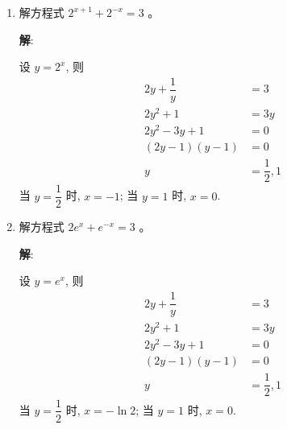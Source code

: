 \documentclass{report}
\newcommand{\sol}{\vspace{0.2cm}\textbf{解}:}
\begin{document}
\begin{multicols*}{2}
\begin{enumerate}[leftmargin=*]
              \sol{}
              \begin{align*}
                  5 \cdot 2^{x-1}             & = 3 \cdot 7^x                                  \\
                  \dfrac{5}{2} \cdot 2^x      & = 3 \cdot 7^x                                  \\
                  \left(\dfrac{2}{7}\right)^x & = \dfrac{6}{5}                                 \\
                  x                           & = \log_{\frac{2}{7}} \dfrac{6}{5}              \\
                                              & = \dfrac{\log \dfrac{6}{5}}{\log \dfrac{2}{7}} \\
                                              & \approx -0.1455
              \end{align*}

        \item 解方程式 $2^{x+1}+2^{-x}=3$ 。

              \sol{}

              设 $y = 2^x$, 则
              \begin{align*}
                  2y + \dfrac{1}{y} & = 3               \\
                  2y^2 + 1          & = 3y              \\
                  2y^2 - 3y + 1     & = 0               \\
                  (2y - 1)(y - 1)   & = 0               \\
                  y                 & = \dfrac{1}{2}, 1
              \end{align*}
              当 $y = \dfrac{1}{2}$ 时, $x = -1$; 当 $y = 1$ 时, $x = 0$.

        \item 解方程式 $2 e^x+e^{-x}=3$ 。

              \sol{}

              设 $y = e^x$, 则
              \begin{align*}
                  2y + \dfrac{1}{y} & = 3               \\
                  2y^2 + 1          & = 3y              \\
                  2y^2 - 3y + 1     & = 0               \\
                  (2y - 1)(y - 1)   & = 0               \\
                  y                 & = \dfrac{1}{2}, 1
              \end{align*}
              当 $y = \dfrac{1}{2}$ 时, $x = -\ln 2$; 当 $y = 1$ 时, $x = 0$.


\end{enumerate}
\end{multicols*}
\end{document}
